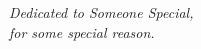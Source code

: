 \null \vfill
\begin{flushright}
{\em Dedicated to Someone Special,}\\
{\em for some special reason.}
\end{flushright}
\null \vfill
